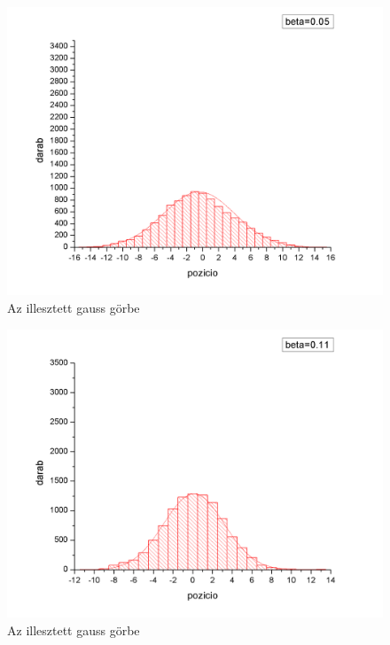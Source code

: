 \documentclass[paper=a4, fontsize=11pt]{article}
\begin{document}
\begin{figure}[H]
\includegraphics[width=\textwidth]{1g.png}
\caption{Az illesztett gauss görbe}
\end{figure}
\begin{figure}[H]
\includegraphics[width=\textwidth]{2g.png}
\caption{Az illesztett gauss görbe}
\end{figure}
\end{document}
